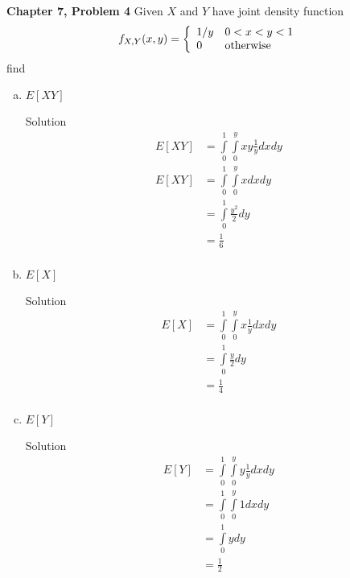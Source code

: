 \documentclass{article}
\begin{document}
\begin{spacing}{1.1}
\newpage
\begin{homeworkProblem}
  {\bf Chapter 7, Problem 4}
  Given $X$ and $Y$ have joint density function
  \[
    f_{X, Y}( x, y) = \left\{ \begin{array}{l l}
      1/y &0 < x < y < 1\\
      0   &\text{otherwise}
    \end{array}\right.
  \]
  find
  \begin{enumerate}[(a)]
    \item $E[XY]$
      \begin{homeworkSection}{Solution}
        \begin{align*}
          E[ XY] &=  \int\limits_0^1 \int\limits_0^y xy\frac{ 1}{ y} dx dy\\
          E[ XY] &=  \int\limits_0^1 \int\limits_0^y x dx dy\\
          &= \int\limits_0^1 \frac{ y^2}{ 2} dy\\
          &= \frac{ 1}{ 6}\\
        \end{align*}
      \end{homeworkSection}
    \item $E[X]$
      \begin{homeworkSection}{Solution}
        \begin{align*}
          E[ X] &=  \int\limits_0^1 \int\limits_0^y x\frac{ 1}{ y} dx dy\\
          &= \int\limits_0^1 \frac{ y}{ 2} dy\\
          &= \frac{ 1}{ 4}\\
        \end{align*}
      \end{homeworkSection}
    \item $E[Y]$
      \begin{homeworkSection}{Solution}
        \begin{align*}
          E[ Y] &=  \int\limits_0^1 \int\limits_0^y y\frac{ 1}{ y} dx dy\\
          &=  \int\limits_0^1 \int\limits_0^y 1 dx dy\\
          &=  \int\limits_0^1 y dy\\
          &=  \frac{ 1}{ 2}\\
        \end{align*}
      \end{homeworkSection}
  \end{enumerate}
\end{homeworkProblem}


\end{spacing}
\end{document}
